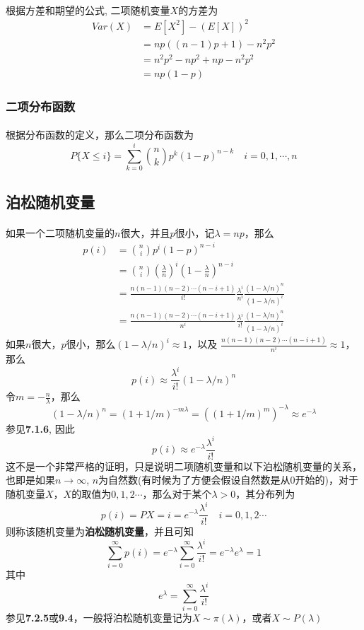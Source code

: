 \paragraph{}
根据方差和期望的公式, 二项随机变量$X$的方差为
\begin{align*}
Var(X) &= E[X^2] - (E[X])^2 \\
		   &= np((n-1)p +1)  - n^2 p^2 \\
		   &= n^2 p^2 - np^2 + np - n^2 p^2 \\
		   &= np(1-p)
\end{align*}


\subsubsection{二项分布函数}
\paragraph{}
根据分布函数的定义，那么二项分布函数为
$$
P\{X \leq i\} = \sum_{k=0}^i {n\choose k} p^k (1-p)^{n-k}\quad i = 0, 1, \cdots, n
$$

\subsection{泊松随机变量}
\paragraph{}
如果一个二项随机变量的$n$很大，并且$p$很小，记$\lambda = np$，那么
\begin{align*}
p(i) &= {n\choose i} p^i (1-p)^{n-i} \\
	  &= {n\choose i} (\frac{\lambda}{n})^i (1 - \frac{\lambda}{n})^{n-i} \\
	  &= \frac{n(n-1)(n-2)\cdots (n-i+1)}{i!} \frac{\lambda^i}{n^i} \frac{(1-\lambda/n)^n}{(1- \lambda/n)^i} \\
	  &= \frac{n(n-1)(n-2)\cdots (n-i+1)}{n^i} \frac{\lambda^i}{i!} \frac{(1-\lambda/n)^n}{(1-\lambda/n)^i} 
\end{align*}
如果$n$很大，$p$很小，那么$(1 - \lambda/n)^i \approx 1$，以及 $\frac{n(n-1)(n-2)\cdots (n-i+1)}{n^i} \approx 1$，那么
$$
p(i) \approx   \frac{\lambda^i}{i!} (1-\lambda/n)^n
$$
令$m = - \frac{n}{\lambda}$，那么
$$
(1-\lambda/n)^n = (1+1/m)^{-m\lambda} = ((1+1/m)^m)^{-\lambda} \approx e^{-\lambda}
$$
参见\textbf{7.1.6}, 因此
$$
p(i) \approx e^{-\lambda}  \frac{\lambda^i}{i!}
$$
这不是一个非常严格的证明，只是说明二项随机变量和以下泊松随机变量的关系，也即是如果$n \to \infty$, $n$为自然数(有时候为了方便会假设自然数是从0开始的)，对于随机变量$X$，$X$的取值为$0, 1, 2\cdots$，那么对于某个$\lambda > 0$，其分布列为
$$
p(i) = P{X = i} = e^{-\lambda} \frac{\lambda^i}{i!}\quad i = 0, 1, 2 \cdots 
$$
则称该随机变量为\textbf{泊松随机变量}，并且可知
$$
\sum_{i=0}^\infty p(i) = e^{-\lambda} \sum_{i=0}^\infty \frac{\lambda^i}{i!} = e^{-\lambda} e^\lambda = 1
$$
其中
$$
e^\lambda = \sum_{i=0}^\infty \frac{\lambda^i}{i!}
$$
参见\textbf{7.2.5}或\textbf{9.4}，一般将泊松随机变量记为$X \sim \pi (\lambda)$，或者$X \sim P(\lambda)$

